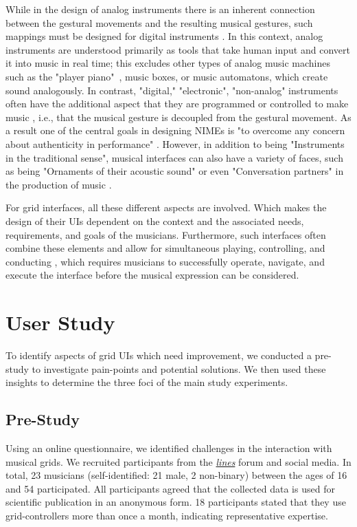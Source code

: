 \documentclass[sigconf]{nimeart}
\begin{document}
While in the design of analog instruments there is an inherent connection between the gestural movements and the resulting musical gestures, such mappings must be designed for digital instruments \cite{10.2307U002F40962941,inproceedings}. In this context, analog instruments are understood primarily as tools that take human input and convert it into music in real time; this excludes other types of analog music machines such as the "player piano"~\cite{Armstrong2007}, music boxes, or music automatons, which create sound analogously. In contrast, "digital," "electronic", "non-analog" instruments often have the additional aspect that they are programmed or controlled to make music \cite{U00F6ke_2020}, i.e., that the musical gesture is decoupled from the gestural movement. As a result one of the central goals in designing NIMEs is "to overcome any concern about authenticity in performance" \cite{paine_2009}. However, in addition to being "Instruments in the traditional sense", musical interfaces can also have a variety of faces, such as being "Ornaments of their acoustic sound" or even "Conversation partners" in the production of music \cite{Johnston2008DesigningAE}.

For grid interfaces, all these different aspects are involved. Which makes the design of their UIs dependent on the context and the associated needs, requirements, and goals of the musicians. Furthermore, such interfaces often combine these elements and allow for simultaneous playing, controlling, and conducting \cite{bell2017pedagogy}, which requires musicians to successfully operate, navigate, and execute the interface before the musical expression can be considered.

\section{User Study}\label{user-study}

To identify aspects of grid UIs which need improvement, we conducted a pre-study to investigate pain-points and potential solutions. We then used these insights to determine the three foci of the main study experiments.

\subsection{Pre-Study}\label{pre-study}

Using an online questionnaire, we identified challenges in the interaction with musical grids. We recruited participants from the \href{https://llllllll.co}{\emph{lines}} \emph{} forum and social media. In total, 23 musicians (self-identified: 21 male, 2 non-binary) between the ages of 16 and 54 participated. All participants agreed that the collected data is used for scientific publication in an anonymous form. 18 participants stated that they use grid-controllers more than once a month, indicating representative expertise.
\end{document}
